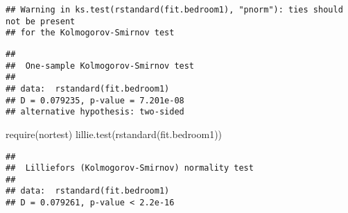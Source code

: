 \documentclass[
]{article}
\newenvironment{Shaded}{\begin{snugshade}}{\end{snugshade}}
\newcommand{\FunctionTok}[1]{\textcolor[rgb]{0.00,0.00,0.00}{#1}}
\newcommand{\NormalTok}[1]{#1}
\begin{document}
\begin{verbatim}
## Warning in ks.test(rstandard(fit.bedroom1), "pnorm"): ties should not be present
## for the Kolmogorov-Smirnov test
\end{verbatim}

\begin{verbatim}
## 
##  One-sample Kolmogorov-Smirnov test
## 
## data:  rstandard(fit.bedroom1)
## D = 0.079235, p-value = 7.201e-08
## alternative hypothesis: two-sided
\end{verbatim}

\begin{Shaded}
\begin{Highlighting}[]
\FunctionTok{require}\NormalTok{(nortest)}
\FunctionTok{lillie.test}\NormalTok{(}\FunctionTok{rstandard}\NormalTok{(fit.bedroom1))}
\end{Highlighting}
\end{Shaded}

\begin{verbatim}
## 
##  Lilliefors (Kolmogorov-Smirnov) normality test
## 
## data:  rstandard(fit.bedroom1)
## D = 0.079261, p-value < 2.2e-16
\end{verbatim}
\end{document}
